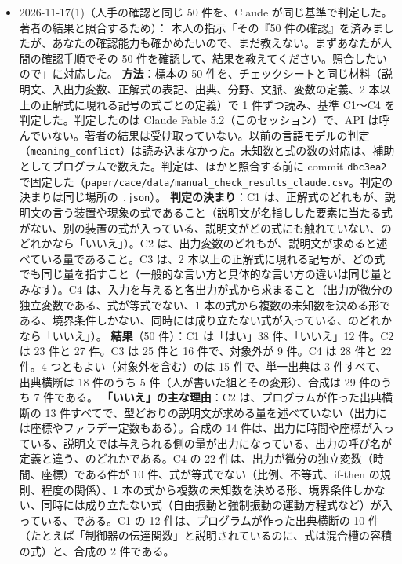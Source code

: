 \documentclass[11pt,a4paper]{jsarticle}
\begin{document}
\begin{itemize}[nosep]
    \textbf{見積もり（実行していない）}：同じ基準を評価用の 1,731 件すべてに言語モデルで当てる場合、ケースの文字数（合わせて約 526 万字）からの概算で、Claude Opus 5.5 なら 20 ドル前後である（入力 100 万トークンあたり 4 ドル、出力 20 ドルで計算。実行する前にトークン数を数え直し、本人の承認を取る）。
  \item 2026-11-17(1)（人手の確認と同じ 50 件を、Claude が同じ基準で判定した。著者の結果と照合するため）：
    本人の指示「その『50 件の確認』を済みましたが、あなたの確認能力も確かめたいので、まだ教えない。まずあなたが人間の確認手順でその 50 件を確認して、結果を教えてください。照合したいので」に対応した。
    \textbf{方法}：標本の 50 件を、チェックシートと同じ材料（説明文、入出力変数、正解式の表記、出典、分野、文脈、変数の定義、2 本以上の正解式に現れる記号の式ごとの定義）で 1 件ずつ読み、基準 C1〜C4 を判定した。判定したのは Claude Fable 5.2（このセッション）で、API は呼んでいない。著者の結果は受け取っていない。以前の言語モデルの判定（\texttt{meaning\_conflict}）は読み込まなかった。未知数と式の数の対応は、補助としてプログラムで数えた。判定は、ほかと照合する前に commit \texttt{dbc3ea2} で固定した（\texttt{paper/cace/data/manual\_check\_results\_claude.csv}。判定の決まりは同じ場所の \texttt{.json}）。
    \textbf{判定の決まり}：C1 は、正解式のどれもが、説明文の言う装置や現象の式であること（説明文が名指しした要素に当たる式がない、別の装置の式が入っている、説明文がどの式にも触れていない、のどれかなら「いいえ」）。C2 は、出力変数のどれもが、説明文が求めると述べている量であること。C3 は、2 本以上の正解式に現れる記号が、どの式でも同じ量を指すこと（一般的な言い方と具体的な言い方の違いは同じ量とみなす）。C4 は、入力を与えると各出力が式から求まること（出力が微分の独立変数である、式が等式でない、1 本の式から複数の未知数を決める形である、境界条件しかない、同時には成り立たない式が入っている、のどれかなら「いいえ」）。
    \textbf{結果}（50 件）：C1 は「はい」38 件、「いいえ」12 件。C2 は 23 件と 27 件。C3 は 25 件と 16 件で、対象外が 9 件。C4 は 28 件と 22 件。4 つともよい（対象外を含む）のは 15 件で、単一出典は 3 件すべて、出典横断は 18 件のうち 5 件（人が書いた組とその変形）、合成は 29 件のうち 7 件である。
    \textbf{「いいえ」の主な理由}：C2 は、プログラムが作った出典横断の 13 件すべてで、型どおりの説明文が求める量を述べていない（出力には座標やファラデー定数もある）。合成の 14 件は、出力に時間や座標が入っている、説明文では与えられる側の量が出力になっている、出力の呼び名が定義と違う、のどれかである。C4 の 22 件は、出力が微分の独立変数（時間、座標）である件が 10 件、式が等式でない（比例、不等式、if-then の規則、程度の関係）、1 本の式から複数の未知数を決める形、境界条件しかない、同時には成り立たない式（自由振動と強制振動の運動方程式など）が入っている、である。C1 の 12 件は、プログラムが作った出典横断の 10 件（たとえば「制御器の伝達関数」と説明されているのに、式は混合槽の容積の式）と、合成の 2 件である。

\end{itemize}
\end{document}
